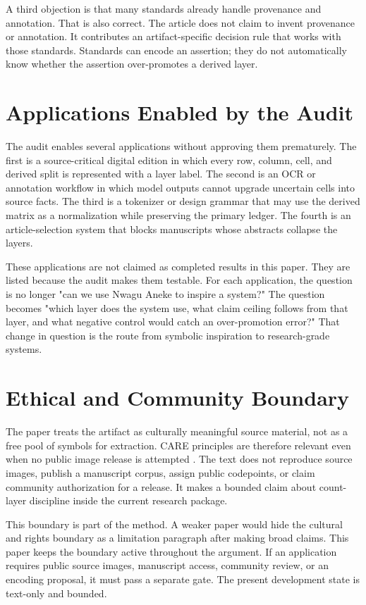 \documentclass[sigconf,nonacm]{acmart}
\begin{document}
A third objection is that many standards already handle provenance and
annotation. That is also correct. The article does not claim to invent
provenance or annotation. It contributes an artifact-specific decision rule that
works with those standards. Standards can encode an assertion; they do not
automatically know whether the assertion over-promotes a derived layer.

\section{Applications Enabled by the Audit}
The audit enables several applications without approving them prematurely. The
first is a source-critical digital edition in which every row, column, cell, and
derived split is represented with a layer label. The second is an OCR or
annotation workflow in which model outputs cannot upgrade uncertain cells into
source facts. The third is a tokenizer or design grammar that may use the
derived matrix as a normalization while preserving the primary ledger. The
fourth is an article-selection system that blocks manuscripts whose abstracts
collapse the layers.

These applications are not claimed as completed results in this paper. They are
listed because the audit makes them testable. For each application, the question
is no longer "can we use Nwagu Aneke to inspire a system?" The question becomes
"which layer does the system use, what claim ceiling follows from that layer,
and what negative control would catch an over-promotion error?" That change in
question is the route from symbolic inspiration to research-grade systems.

\section{Ethical and Community Boundary}
The paper treats the artifact as culturally meaningful source material, not as a
free pool of symbols for extraction. CARE principles are therefore relevant even
when no public image release is attempted \cite{carroll2020care}. The text
does not reproduce source images, publish a manuscript corpus, assign public
codepoints, or claim community authorization for a release. It makes a bounded
claim about count-layer discipline inside the current research package.

This boundary is part of the method. A weaker paper would hide the cultural and
rights boundary as a limitation paragraph after making broad claims. This paper
keeps the boundary active throughout the argument. If an application requires
public source images, manuscript access, community review, or an encoding
proposal, it must pass a separate gate. The present development state is
text-only and bounded.
\end{document}
